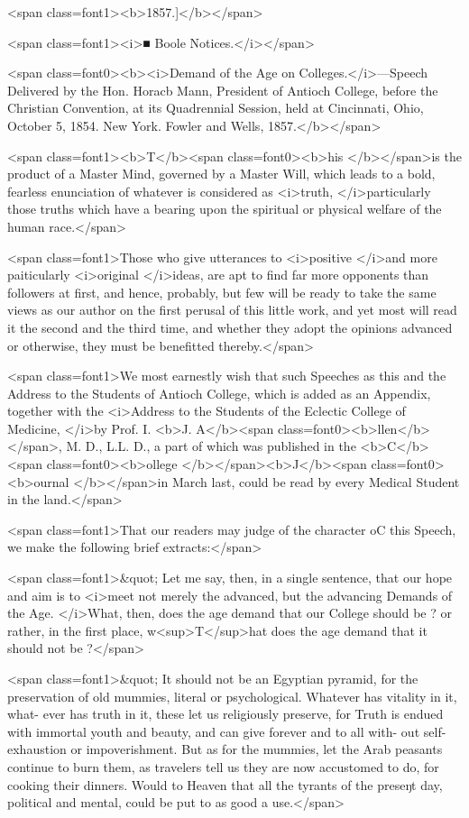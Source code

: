 <span class=font1><b>1857.]</b></span>

<span class=font1><i>■ Boole Notices.</i></span>

<span class=font0><b><i>Demand of the Age on Colleges.</i>—Speech Delivered by the Hon. Horacb Mann, President of
Antioch College, before the Christian Convention, at its Quadrennial Session, held at
Cincinnati, Ohio, October 5, 1854.   New York.   Fowler and Wells, 1857.</b></span>

<span class=font1><b>T</b><span class=font0><b>his </b></span>is the product of a Master Mind, governed by a Master Will,
which leads to a bold, fearless enunciation of whatever is considered as
<i>truth, </i>particularly those truths which have a bearing upon the spiritual
or physical welfare of the human race.</span>

<span class=font1>Those who give utterances to <i>positive </i>and more paiticularly <i>original
</i>ideas, are apt to find far more opponents than followers at first, and
hence, probably, but few will be ready to take the same views as our
author on the first perusal of this little work, and yet most will read it
the second and the third time, and whether they adopt the opinions
advanced or otherwise, they must be benefitted thereby.</span>

<span class=font1>We most earnestly wish that such Speeches as this and the Address
to the Students of Antioch College, which is added as an Appendix,
together with the <i>Address to the Students of the Eclectic College of
Medicine, </i>by Prof. I. <b>J. A</b><span class=font0><b>llen</b></span>, M. D., L.L. D., a part of which was
published in the <b>C</b><span class=font0><b>ollege </b></span><b>J</b><span class=font0><b>ournal </b></span>in March last, could be read by every
Medical Student in the land.</span>

<span class=font1>That our readers may judge of the character oC this Speech, we
make the following brief extracts:</span>

<span class=font1>&quot; Let me say, then, in a single sentence, that our hope and aim is to
<i>meet not merely the advanced, but the advancing Demands of the Age.
</i>What, then, does the age demand that our College should be ? or rather,
in the first place, w<sup>T</sup>hat does the age demand that it should not be ?</span>

<span class=font1>&quot; It should not be an Egyptian pyramid, for the preservation of old
mummies, literal or psychological. Whatever has vitality in it, what-
ever has truth in it, these let us religiously preserve, for Truth is endued
with immortal youth and beauty, and can give forever and to all with-
out self-exhaustion or impoverishment. But as for the mummies, let
the Arab peasants continue to burn them, as travelers tell us they are
now accustomed to do, for cooking their dinners. Would to Heaven
that all the tyrants of the preseŋt day, political and mental, could be
put to as good a use.</span>

